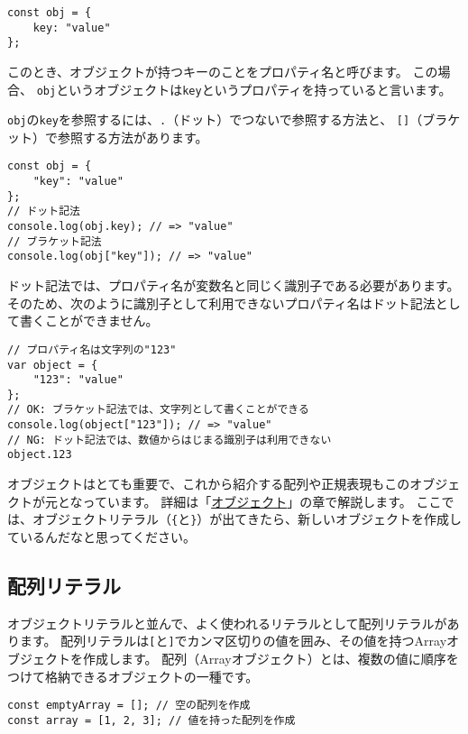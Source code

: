 \begin{lstlisting}
const obj = {
    key: "value"
};
\end{lstlisting}

このとき、オブジェクトが持つキーのことをプロパティ名と呼びます。
この場合、
\texttt{obj}というオブジェクトは\texttt{key}というプロパティを持っていると言います。

\texttt{obj}の\texttt{key}を参照するには、\texttt{.}（ドット）でつないで参照する方法と、
\texttt{[]}（ブラケット）で参照する方法があります。

\begin{lstlisting}
const obj = {
    "key": "value"
};
// ドット記法
console.log(obj.key); // => "value"
// ブラケット記法
console.log(obj["key"]); // => "value"
\end{lstlisting}

ドット記法では、プロパティ名が変数名と同じく識別子である必要があります。
そのため、次のように識別子として利用できないプロパティ名はドット記法として書くことができません。

\begin{lstlisting}
// プロパティ名は文字列の"123"
var object = {
    "123": "value"
};
// OK: ブラケット記法では、文字列として書くことができる
console.log(object["123"]); // => "value"
// NG: ドット記法では、数値からはじまる識別子は利用できない
object.123
\end{lstlisting}

オブジェクトはとても重要で、これから紹介する配列や正規表現もこのオブジェクトが元となっています。
詳細は「\hyperlink{object}{オブジェクト}」の章で解説します。
ここでは、オブジェクトリテラル（\texttt{\{}と\texttt{\}}）が出てきたら、新しいオブジェクトを作成しているんだなと思ってください。

\hypertarget{array-literal}{%
\subsection{配列リテラル}\label{array-literal}}

オブジェクトリテラルと並んで、よく使われるリテラルとして配列リテラルがあります。
配列リテラルは\texttt{[}と\texttt{]}でカンマ区切りの値を囲み、その値を持つArrayオブジェクトを作成します。
配列（Arrayオブジェクト）とは、複数の値に順序をつけて格納できるオブジェクトの一種です。

\begin{lstlisting}
const emptyArray = []; // 空の配列を作成
const array = [1, 2, 3]; // 値を持った配列を作成
\end{lstlisting}

